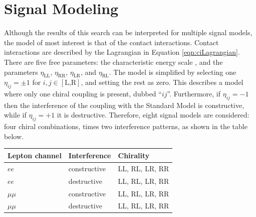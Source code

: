 \section{Signal Modeling}\label{sec:ciSig}



Although the results of this search can be interpreted for multiple signal models, the model of most interest is that of the \llqq contact interactions.
Contact interactions are described by the Lagrangian in Equation \ref{eqn:ciLagrangian}.
There are five free parameters: the characteristic energy scale \lam, and the parameters $\eta_\text{LL}$, $\eta_\text{RR}$, $\eta_\text{LR}$, and $\eta_\text{RL}$.
The model is simplified by selecting one $\eta_{ij}=\pm1$ for $i,j\in[\text{L,R}]$, and setting the rest as zero.
This describes a model where only one chiral coupling is present, dubbed ``$ij$''.
Furthermore, if $\eta_{ij}=-1$ then the interference of the coupling with the Standard Model is constructive, while if $\eta_{ij}=+1$ it is destructive.
Therefore, eight signal models are considered: four chiral combinations, times two interference patterns, as shown in the table below.
\begin{center}
\begin{tabular}{|l|l|l|}
  \toprule
  Lepton channel & Interference & Chirality \\
  \midrule
  $ee$ & constructive & LL, RL, LR, RR \\
  $ee$ & destructive & LL, RL, LR, RR \\
  $\mu\mu$ & constructive & LL, RL, LR, RR \\
  $\mu\mu$ & destructive & LL, RL, LR, RR \\
  \bottomrule
\end{tabular}
\end{center}


